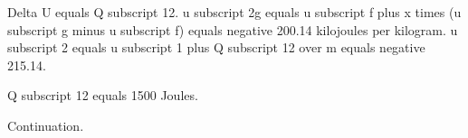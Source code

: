 Delta U equals Q subscript 12. 
u subscript 2g equals u subscript f plus x times (u subscript g minus u subscript f) equals negative 200.14 kilojoules per kilogram. 
u subscript 2 equals u subscript 1 plus Q subscript 12 over m equals negative 215.14.

Q subscript 12 equals 1500 Joules.

Continuation.